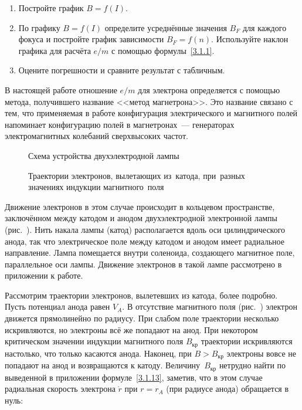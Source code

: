 \begin{lab:task}

\begin{enumerate}
\item{Постройте график $B=f(I)$.}
\item{По графику $B=f(I)$ определите усреднённые значения $B_F$ для каждого фокуса и постройте график зависимости $B_F=f(n)$. Используйте наклон графика для расчёта $e/m$ с помощью формулы~\eqref{3.1.1}.}
\item{Оцените погрешности и сравните результат с табличным.}

\end{enumerate}
\end{lab:task}



В настоящей работе отношение $e/m$ для электрона определяется с помощью метода, получившего название <<метод
магнетрона>>. Это название связано с тем, что применяемая в работе конфигурация электрического и магнитного полей
напоминает конфигурацию полей в магнетронах~--- генераторах электромагнитных колебаний сверхвысоких частот.

\begin{figure}[h!]
	\begin{minipage}[b]{0.49\textwidth}
		\caption{Схема устройства двухэлектродной лампы}
	\end{minipage}
	\hfill
	\begin{minipage}[b]{0.49\textwidth}
		\caption{Траектории электронов, вылетающих из~катода, при~разных значениях индукции магнитного~поля}
	\end{minipage}
\end{figure}

Движение электронов в этом случае происходит в кольцевом пространстве, заключённом между катодом и анодом
двухэлектродной электронной лампы (рис.~). Нить накала лампы (катод) располагается вдоль оси цилиндрического анода, так что электрическое поле между катодом и анодом имеет радиальное направление. Лампа помещается внутри соленоида, создающего магнитное поле, параллельное оси лампы. Движение электронов в такой лампе рассмотрено в приложении к работе.

Рассмотрим траектории электронов, вылетевших из катода, более подробно. Пусть потенциал анода равен $V_A$. В отсутствие магнитного поля (рис.~) электрон движется прямолинейно по радиусу. При слабом поле траектории несколько искривляются, но электроны всё же попадают на анод. При некотором критическом значении индукции магнитного поля $B_\text{кр}$ траектории искривляются настолько, что только касаются анода. Наконец, при $B>B_\text{кр}$ электроны вовсе не попадают на анод и возвращаются к катоду. Величину~$B_\text{кр}$ нетрудно найти по выведенной в приложении формуле~\eqref{3.1.13}, заметив, что в этом случае радиальная скорость электрона $\dot{r}$ при $r=r_A$ (при радиусе анода) обращается в нуль:

